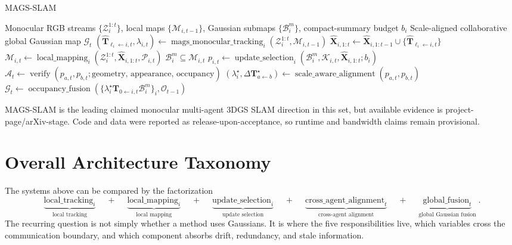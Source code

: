 \documentclass[11pt, a4paper, logo]{googledeepmind}
\begin{document}
\begin{algorithm}[H]
\caption{MAGS-SLAM}
\label{alg:mags-slam}
\small
\begin{algorithmic}[1]
  \Require Monocular RGB streams $\{\mathcal{Z}_i^{1:t}\}$, local maps $\{\mathcal{M}_{i,t-1}\}$, Gaussian submaps $\{\mathcal{B}_{i}^{m}\}$, compact-summary budget $b_i$
  \Ensure Scale-aligned collaborative global Gaussian map $\mathcal{G}_t$
  \State $(\hat{\mathbf{T}}_{\ell_i\leftarrow i,t},\lambda_{i,t}) \gets \operatorname{mags\_monocular\_tracking}_i(\mathcal{Z}_i^{1:t},\mathcal{M}_{i,t-1})$ 
  \State $\hat{\mathbf{X}}_{i,1:t} \gets \hat{\mathbf{X}}_{i,1:t-1}\cup\{\hat{\mathbf{T}}_{\ell_i\leftarrow i,t}\}$ 
  \State $\mathcal{M}_{i,t} \gets \operatorname{local\_mapping}_i(\mathcal{Z}_i^{1:t},\hat{\mathbf{X}}_{i,1:t},\mathcal{P}_{i,t})$ 
  \State $\mathcal{B}_{i}^{m} \subseteq \mathcal{M}_{i,t}$ 
  \State $p_{i,t} \gets \operatorname{update\_selection}_i(\mathcal{B}_{i}^{m},\mathcal{K}_{i,t},\hat{\mathbf{X}}_{i,1:t};b_i)$ 
  \State $\mathcal{A}_t \gets \operatorname{verify}(p_{a,t},p_{b,t};\text{geometry, appearance, occupancy})$ 
  \State $(\lambda_i^\star,\Delta\mathbf{T}_{a\leftarrow b}^\star) \gets \operatorname{scale\_aware\_alignment}(p_{a,t},p_{b,t})$ 
  \State $\mathcal{G}_t \gets \operatorname{occupancy\_fusion}(\{\lambda_i^\star\mathbf{T}_{0\leftarrow i,t}\mathcal{B}_{i}^{m}\}_i,\mathcal{O}_{t-1})$ 
\end{algorithmic}
\end{algorithm}

MAGS-SLAM is the leading claimed monocular multi-agent 3DGS SLAM direction in this set, but available evidence is project-page/arXiv-stage. Code and data were reported as release-upon-acceptance, so runtime and bandwidth claims remain provisional.

\section{Overall Architecture Taxonomy}

The systems above can be compared by the factorization
\[
\underbrace{\operatorname{local\_tracking}_i}_{\text{local tracking}}
\quad + \quad
\underbrace{\operatorname{local\_mapping}_i}_{\text{local mapping}}
\quad + \quad
\underbrace{\operatorname{update\_selection}_i}_{\text{update selection}}
\quad + \quad
\underbrace{\operatorname{cross\_agent\_alignment}_t}_{\text{cross-agent alignment}}
\quad + \quad
\underbrace{\operatorname{global\_fusion}_t}_{\text{global Gaussian fusion}}.
\]
The recurring question is not simply whether a method uses Gaussians. It is where the five responsibilities live, which variables cross the communication boundary, and which component absorbs drift, redundancy, and stale information.
\end{document}
